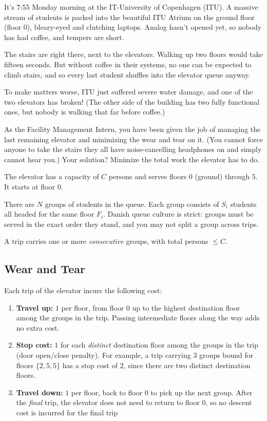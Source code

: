 
It's 7{:}55 Monday morning at the IT-University of Copenhagen (ITU). A massive stream of students
is packed into the beautiful ITU Atrium on the ground floor (floor $0$), bleary-eyed and clutching
laptops. Analog hasn't opened yet, so nobody has had coffee, and tempers are short.

The stairs are right there, next to the elevators. Walking up two floors would take fifteen seconds.
But without coffee in their systems, no one can be expected to climb stairs, and so every last
student shuffles into the elevator queue anyway.

To make matters worse, ITU just suffered severe water damage, and one of the two elevators has
broken! (The other side of the building has two fully functional ones, but nobody is walking that
far before coffee.)

As the Facility Management Intern, you have been given the job of managing the last remaining
elevator and minimizing the wear and tear on it. (You cannot force anyone to take the stairs
they all have noise-cancelling headphones on and simply cannot hear you.) Your solution? Minimize
the total work the elevator has to do.

The elevator has a capacity of $C$ persons and serves floors $0$ (ground) through $5$. It starts
at floor $0$.

There are $N$ groups of students in the queue. Each group consists of $S_i$ students all headed for
the same floor $F_i$. Danish queue culture is strict: groups must be served in the exact order they
stand, and you may not split a group across trips.

A trip carries one or more \emph{consecutive} groups, with total persons $\leq C$.

\subsection*{Wear and Tear}

Each trip of the elevator incurs the following cost:

\begin{enumerate}
    \item \textbf{Travel up:} $1$ per floor, from floor $0$ up to the highest destination floor
    among the groups in the trip. Passing intermediate floors along the way adds no extra cost.
    \item \textbf{Stop cost:} $1$ for each \emph{distinct} destination floor among the groups in
    the trip (door open/close penalty). For example, a trip carrying 3 groups bound for floors
    $\{2, 5, 5\}$ has a stop cost of $2$, since there are two distinct destination floors.
    \item \textbf{Travel down:} $1$ per floor, back to floor $0$ to pick up the next group. After
    the \emph{final} trip, the elevator does not need to return to floor $0$, so no descent cost
    is incurred for the final trip
\end{enumerate}

